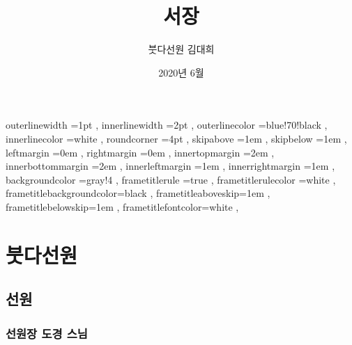 \documentclass[12pt, a4paper, oneside]{book}
\let\stdsection\section
\renewcommand\section{\newpage\stdsection}
\begin{document}
	
			\dominitoc
			\doparttoc			




			\title{서장}
			\author{붓다선원 김대희}
			\date{2020년 6월}
			\maketitle


			\tableofcontents 		%
			\cleardoublepage
			\listoftables 			%





		 {
						outerlinewidth		=1pt			,%
						innerlinewidth		=2pt			,%
						outerlinecolor		=blue!70!black	,%
						innerlinecolor		=white 			,%
						roundcorner			=4pt			,%
						skipabove			=1em 			,%
						skipbelow			=1em 			,%
						leftmargin			=0em			,%
						rightmargin			=0em			,%
						innertopmargin		=2em 			,%
						innerbottommargin 	=2em 			,%
						innerleftmargin		=1em 			,%
						innerrightmargin		=1em 			,%
						backgroundcolor		=gray!4			,%
						frametitlerule		=true 			,%
						frametitlerulecolor	=white			,%
						frametitlebackgroundcolor=black		,%
						frametitleaboveskip=1em 			,%
						frametitlebelowskip=1em 			,%
						frametitlefontcolor=white 			,%
						}



	\part{붓다선원}
	\noptcrule
	\parttoc				

	\chapter{선원}
	\noptcrule

	\newpage	
	\minitoc


%
	\section{선원장 도경 스님 }
\end{document}

